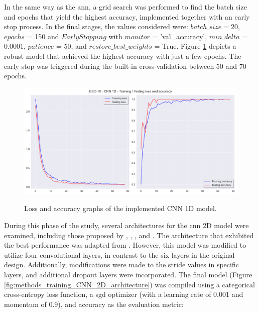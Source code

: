 In the same way as the \gls{ann}, a grid search was performed to find the batch size and epochs that yield the highest accuracy, implemented together with an early stop process. In the final stages, the values considered were: $batch\_size = 20$, $epochs$ = 150 and $EarlyStopping$ with $monitor$ = 'val\_accuracy', $min\_delta$ = 0.0001, $patience$ = 50, and $restore\_best\_weights$ = True. Figure \ref{fig:methods_training_CNN_1D_loss_and_accuracy_graphs} depicts a robust model that achieved the highest accuracy with just a few epochs. The early stop was triggered during the built-in cross-validation between 50 and 70 epochs.


\begin{figure}[htbp]
    \raggedright
        \caption{Loss and accuracy graphs of the implemented CNN 1D model.}
        \includegraphics[width=1\textwidth]{resources/images/050-methods/Methods_training_CNN1D_loss_accuracy.png}
        \label{fig:methods_training_CNN_1D_loss_and_accuracy_graphs}
\end{figure} 


During this phase of the study, several architectures for the \gls{cnn} 2D model were examined, including those proposed by \textcite{Piczak2015}, \textcite{Su2020}, \textcite{Luz2021}, and \textcite{Chu2023}. The architecture that exhibited the best performance was adapted from \textcite{Su2020}. However, this model was modified to utilize four convolutional layers, in contrast to the six layers in the original design. Additionally, modifications were made to the stride values in specific layers, and additional dropout layers were incorporated. The final model (Figure \ref{fig:methods_training_CNN_2D_architecture}) was compiled using a categorical cross-entropy loss function, a \gls{sgd} optimizer (with a learning rate of 0.001 and momentum of 0.9), and accuracy as the evaluation metric:

